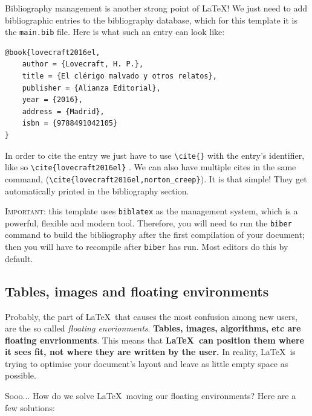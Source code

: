 Bibliography management is another strong point of \LaTeX! We just need to add bibliographic entries to the bibliography database, which for this template it is the \texttt{main.bib} file. Here is what such an entry can look like:

\begin{lstlisting}[language={[LaTeX]TeX}]
@book{lovecraft2016el,
	author = {Lovecraft, H. P.},
	title = {El clérigo malvado y otros relatos},
	publisher = {Alianza Editorial},
	year = {2016},
	address = {Madrid},
	isbn = {9788491042105}
}
\end{lstlisting}

In order to cite the entry we just have to use \verb|\cite{}| with the entry's identifier, like so \verb|\cite{lovecraft2016el}| \cite{lovecraft2016el}. We can also have multiple cites in the same command, \cite{lovecraft2016el,norton_creep} (\verb|\cite{lovecraft2016el,norton_creep}|). It is that simple! They get automatically printed in the bibliography section.

\textsc{\color{red}Important:} this template uses \texttt{biblatex} as the management system, which is a powerful, flexible and modern tool. Therefore, you will need to run the \texttt{biber} command to build the bibliography after the first compilation of your document; then you will have to recompile after \texttt{biber} has run. Most editors do this by default.

\subsection{Tables, images and floating environments}

Probably, the part of \LaTeX\ that causes the most confusion among new users, are the so called \emph{floating envrionments}. \textbf{Tables, images, algorithms, etc are floating envrionments}. This means that \textbf{\LaTeX\ can position them where it sees fit, not where they are written by the user.} In reality, \LaTeX\ is trying to optimise your document's layout and leave as little empty space as possible.

Sooo... How do we solve \LaTeX\ moving our floating environments? Here are a few solutions:

